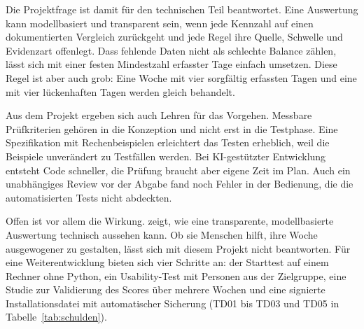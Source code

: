 Die Projektfrage ist damit für den technischen Teil beantwortet. Eine Auswertung kann modellbasiert und transparent sein, wenn jede Kennzahl auf einen dokumentierten Vergleich zurückgeht und jede Regel ihre Quelle, Schwelle und Evidenzart offenlegt. Dass fehlende Daten nicht als schlechte Balance zählen, lässt sich mit einer festen Mindestzahl erfasster Tage einfach umsetzen. Diese Regel ist aber auch grob: Eine Woche mit vier sorgfältig erfassten Tagen und eine mit vier lückenhaften Tagen werden gleich behandelt.

Aus dem Projekt ergeben sich auch Lehren für das Vorgehen. Messbare Prüfkriterien gehören in die Konzeption und nicht erst in die Testphase. Eine Spezifikation mit Rechenbeispielen erleichtert das Testen erheblich, weil die Beispiele unverändert zu Testfällen werden. Bei KI-gestützter Entwicklung entsteht Code schneller, die Prüfung braucht aber eigene Zeit im Plan. Auch ein unabhängiges Review vor der Abgabe fand noch Fehler in der Bedienung, die die automatisierten Tests nicht abdeckten.

Offen ist vor allem die Wirkung. \Projektname{} zeigt, wie eine transparente, modellbasierte Auswertung technisch aussehen kann. Ob sie Menschen hilft, ihre Woche ausgewogener zu gestalten, lässt sich mit diesem Projekt nicht beantworten. Für eine Weiterentwicklung bieten sich vier Schritte an: der Starttest auf einem Rechner ohne Python, ein Usability-Test mit Personen aus der Zielgruppe, eine Studie zur Validierung des Scores über mehrere Wochen und eine signierte Installationsdatei mit automatischer Sicherung (TD01 bis TD03 und TD05 in Tabelle~\ref{tab:schulden}).
